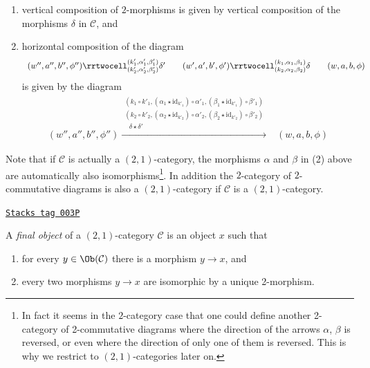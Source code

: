 \begin{enumerate}
$$$$
commute,
\item vertical composition of $2$-morphisms is given by
vertical composition of the morphisms $\delta$ in $\mathcal{C}$, and
\item horizontal composition of the diagram
$$
\begin{array}{ccccc}(w'', a'', b'', \phi'')
\rrtwocell^{(k'_1, \alpha'_1, \beta'_1)}_{(k'_2, \alpha'_2, \beta'_2)}{\delta'} &  & (w', a', b', \phi')
\rrtwocell^{(k_1, \alpha_1, \beta_1)}_{(k_2, \alpha_2, \beta_2)}{\delta} &  & (w, a, b, \phi)\end{array}
$$
is given by the diagram
$$
\begin{array}{cc}(w'', a'', b'', \phi'')
\xrightarrow{\substack{(k_1 \circ k'_1, (\alpha_1 \star \text{id}_{k'_1}) \circ \alpha'_1, (\beta_1 \star \text{id}_{k'_1}) \circ \beta'_1)\\(k_2 \circ k'_2, (\alpha_2 \star \text{id}_{k'_2}) \circ \alpha'_2, (\beta_2 \star \text{id}_{k'_2}) \circ \beta'_2)\\\ \ \ \delta \star \delta'}} & (w, a, b, \phi)\end{array}
$$
\end{enumerate}
Note that if $\mathcal{C}$ is actually a $(2, 1)$-category,
the morphisms $\alpha$ and $\beta$ in (2) above are automatically
also isomorphisms\footnote{In fact it seems in the $2$-category case
that one could define another 2-category of 2-commutative diagrams where
the direction of the arrows $\alpha$, $\beta$ is reversed, or even
where the direction of only one of them is reversed. This is why
we restrict to $(2, 1)$-categories later on.}.
In addition the $2$-category of
$2$-commutative diagrams is also a $(2, 1)$-category if $\mathcal{C}$ is
a $(2, 1)$-category.

\begin{definition}
\label{categories-definition-final-object-2-category}
\href{https://stacks.math.columbia.edu/tag/003P}{\texttt{Stacks tag 003P}}

A {\it final object} of a $(2, 1)$-category
$\mathcal{C}$ is an object $x$ such that
\begin{enumerate}
\item for every $y \in \Ob(\mathcal{C})$ there is a morphism $y \to x$,
and
\item every two morphisms $y \to x$ are isomorphic by a unique 2-morphism.
\end{enumerate}
\end{definition}

